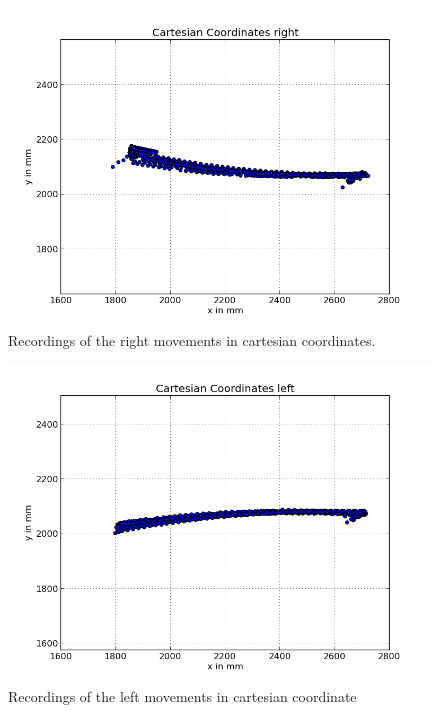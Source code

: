 \documentclass{scrartcl}
\begin{document}
\begin{figure}[H]
\centering
\begin{minipage}{.5\textwidth}
  \centering
  \includegraphics[width=1\linewidth]{img_second_run/Cartesian_right.png}
\end{minipage}%

\caption{Recordings of the right movements in cartesian coordinates.}
\label{fig:outliers}
\end{figure}


\begin{figure}[H]
\centering
\begin{minipage}{.5\textwidth}
  \centering
  \includegraphics[width=1\linewidth]{img_second_run/Cartesian_left.png}
\end{minipage}%

\caption{Recordings of the left movements in cartesian coordinate}
\label{fig:outliers}
\end{figure}
\end{document}
